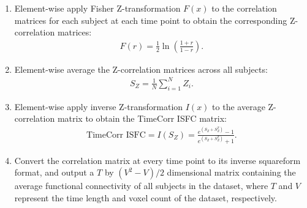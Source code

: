 \documentclass[11pt]{article}
\begin{document}
\begin{enumerate}
\begin{enumerate}
\end{enumerate}
\item Element-wise apply Fisher Z-transformation $F(x)$ to the correlation matrices for each subject at each time point to obtain the corresponding Z-correlation matrices:
\begin{align*}
F(r) = \frac{1}{2}\ln\left(\frac{1+r}{1-r}\right).
\end{align*}
\item Element-wise average the Z-correlation matrices across all subjects:
\begin{align*}
S_Z = \frac{1}{N}\sum^N_{i=1}Z_i.
\end{align*}
\item Element-wise apply inverse Z-transformation $I(x)$ to the average Z-correlation matrix to obtain the TimeCorr ISFC matrix:
\begin{align*}
\text{TimeCorr ISFC} = I(S_Z) = \frac{e^{(S_Z+S_Z^T)}-1}{e^{(S_Z+S_Z^T)}+1}.
\end{align*}
\item Convert the correlation matrix at every time point to its inverse squareform format, and output a $T$ by $(V^2-V)/2$ dimensional matrix containing the average functional connectivity of all subjects in the dataset, where $T$ and $V$ represent the time length and voxel count of the dataset, respectively.
\end{enumerate}
\end{document}
